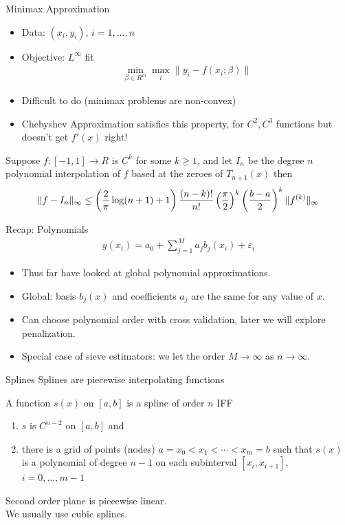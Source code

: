 \documentclass[11pt,handout,xcolor=pdftex,dvipsnames,table,mathserif,aspectratio=169]{beamer}
\begin{document}
\begin{frame}{Minimax Approximation}
\begin{itemize}
\item Data: $(x_i,y_i)$, $i=1,\ldots,n$
\item Objective: $L^{\infty}$ fit
\begin{eqnarray*}
\min_{\beta \in R^m} \max_{i} \| y_i - f(x_i; \beta) \|
\end{eqnarray*}
\item Difficult to do (minimax problems are non-convex)
\item Chebyshev Approximation satisfies this property, for $C^2,C^3$ functions but doesn't get $f'(x)$ right!
\end{itemize}
\begin{theorem}
Suppose $f: [-1,1] \rightarrow R$ is $C^k$ for some $k \geq 1$, and let $I_n$ be the degree $n$ polynomial interpolation of $f$ based at the zeroes of $T_{n+1}(x)$ then
\begin{eqnarray*}
\tiny
\| f - I_n \|_{\infty} \leq \left(\frac{2}{\pi}  \log(n+1) + 1 \right) \frac{(n-k)!}{n!} \left ( \frac{\pi}{2}\right)^k  \left ( \frac{b-a}{2}\right)^k \| f^{(k)} \|_{\infty}
\end{eqnarray*}
\end{theorem}
\end{frame}

\begin{frame}{Recap: Polynomials}
\begin{align*}
y(x_i) = a_0 + \sum_{j=1}^M a_j b_j(x_i) + \varepsilon_i
\end{align*}
\begin{itemize}
\item Thus far have looked at \alert{global polynomial approximations}.
\item Global: basis $b_j(x)$ and coefficients $a_j$ are the same for any value of $x$.
\item Can choose polynomial order with \alert{cross validation}, later we will explore \alert{penalization}.
\item Special case of \alert{sieve estimators}: we let the order $M \rightarrow \infty$ as $n \rightarrow \infty$.
\end{itemize}

\end{frame}


\begin{frame}{Splines}
Splines are piecewise interpolating functions
\begin{definition} 
A function $s(x)$ on $[a,b]$ is a spline of order $n$ IFF
\begin{enumerate}
\item $s$ is $C^{n-2}$ on $[a,b]$ and 
\item there is a grid of points (nodes) $a = x_0 < x_1 < \cdots < x_m = b$ such that $s(x)$ is a polynomial of degree $n-1$ on each subinterval $[x_i, x_{i+1}]$, $i = 0,\ldots,m-1$
\end{enumerate}
\end{definition}
Second order plane is piecewise linear.\\
We usually use cubic splines.
\end{frame}
\end{document}
